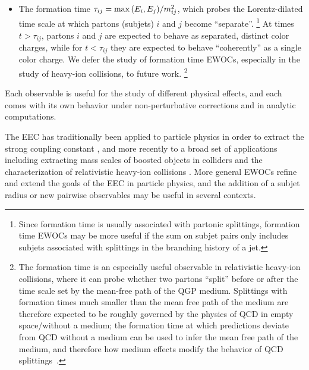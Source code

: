\begin{itemize}
    \item
        The formation time \(\tau_{ij} = \max{\left(E_i, E_j\right)} / m^2_{ij}\), which probes the Lorentz-dilated time scale at which partons (subjets) \(i\) and \(j\)  become ``separate''.%
        \footnote{
            Since formation time is usually associated with partonic splittings, formation time EWOCs may be more useful if the sum on subjet pairs only includes subjets associated with splittings in the branching history of a jet.
        }
        At times  \(t > \tau_{ij}\), partons \(i\) and \(j\) are expected to behave as separated, distinct color charges, while for \(t < \tau_{ij}\) they are expected to behave ``coherently'' as a single color charge.
        We defer the study of formation time EWOCs, especially in the study of heavy-ion collisions, to future work.%
        \footnote{
            The formation time is an especially useful observable in relativistic heavy-ion collisions, where it can probe whether two partons ``split'' before or after the time scale set by the mean-free path of the QGP medium.
            Splittings with formation times much smaller than the mean free path of the medium are therefore expected to be roughly governed by the physics of QCD in empty space/without a medium;
            the formation time at which predictions deviate from QCD without a medium can be used to infer the mean free path of the medium, and therefore how medium effects modify the behavior of QCD splittings~\cite{Gyulassy:1993hr,Baier:1994bd,Zakharov:1996fv,Baier:1996sk,Baier:1996kr,Zakharov:1997uu,Wiedemann:2000ez,Wiedemann:2000za,Gyulassy:2000er,Wang:2001ifa,Kovner:2003zj,Borghini:2005em,Armesto:2007dt,Ovanesyan:2011xy,Ovanesyan:2011kn,Blaizot:2012fh,Fickinger:2013xwa,Apolinario:2014csa,Attems:2022ubu}.
        }
\end{itemize}
%
Each observable is useful for the study of different physical effects, and each comes with its own behavior under non-perturbative corrections and in analytic computations.

The EEC has traditionally been applied to particle physics in order to extract the strong coupling constant \cite{Martin:1986uq,DELPHI:1990sof,SLD:1994yoe,ATLAS:2015yaa,ATLAS:2017qir,dEnterria:2018cye,Kardos:2018kqj,Ali:2020ksn,dEnterria:2022hzv,Komiske:2022enw,ATLAS:2023tgo,CMS:2024mlf}, and more recently to a broad set of applications including extracting mass scales of boosted objects in colliders \cite{Procura:2022fid,Holguin:2022epo,Holguin:2023bjf,Pathak:2023tmy,Xiao:2024rol,Holguin:2024tkz} and the characterization of relativistic heavy-ion collisions \cite{Lokhtin:2004tx,Lokhtin:2006dp,Andres:2022ovj,Barata:2023zqg,Andres:2023xwr,Yang:2023dwc,Barata:2023vnl,Barata:2023bhh,Barata:2024nqo}.
%
More general EWOCs refine and extend the goals of the EEC in particle physics, and the addition of a subjet radius or new pairwise observables may be useful in several contexts.

